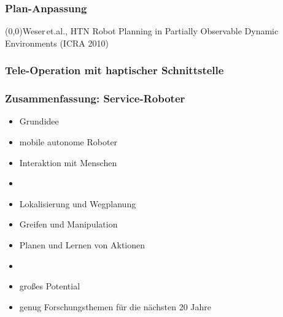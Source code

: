 \documentclass[t]{beamer}
\def\quelle#1{{\tiny \makebox(0,0){}\vfill\hfill #1}}
\def\ii{\item[]}
\begin{document}
\begin{frame}
\frametitle{Plan-Anpassung}
\strut
\vspace*{50mm}
\quelle{Weser\,et.al., 
HTN Robot Planning in Partially Observable Dynamic Environments (ICRA 2010)}
\end{frame}


\begin{frame}
\frametitle{Tele-Operation mit haptischer Schnittstelle}
\end{frame}


%




\begin{frame}
\frametitle{Zusammenfassung: Service-Roboter}
\begin{itemize}
\item Grundidee
\item mobile autonome Roboter
\item Interaktion mit Menschen
\ii
\item Lokalisierung und Wegplanung
\item Greifen und Manipulation
\item Planen und Lernen von Aktionen 
\ii

\item großes Potential
\item genug Forschungsthemen für die nächsten 20 Jahre
\end{itemize}
\end{frame}
\end{document}
